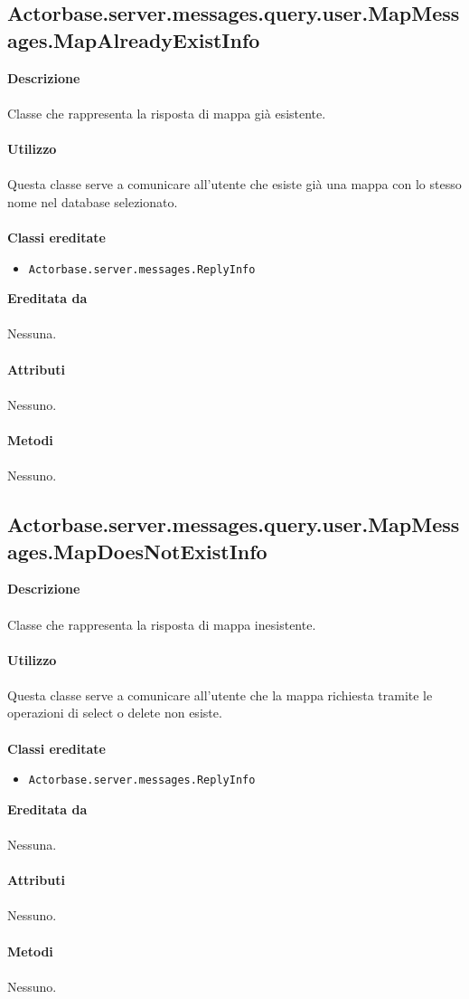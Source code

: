 \documentclass[a4paper]{article}
\begin{document}
	\subsection{Actorbase.server.messages.query.user.MapMessages.MapAlreadyExistInfo}
		\textbf{Descrizione}
			\\ \\
		Classe che rappresenta la risposta di mappa già esistente.
			\\ \\
		\textbf{Utilizzo}
			\\ \\
		Questa classe serve a comunicare all'utente che esiste già una mappa con lo stesso nome nel database selezionato.
			\\ \\
		\textbf{Classi ereditate}
			\begin{itemize}
				\item \texttt{Actorbase.server.messages.ReplyInfo }
			\end{itemize}
		\textbf{Ereditata da}
			\\ \\
			Nessuna.
			\\ \\
		\textbf{Attributi}
			\\ \\
			Nessuno.
			\\ \\
		\textbf{Metodi }
			\\ \\
			Nessuno.
			
	\subsection{Actorbase.server.messages.query.user.MapMessages.MapDoesNotExistInfo}
		\textbf{Descrizione}
			\\ \\
		Classe che rappresenta la risposta di mappa inesistente.
			\\ \\
		\textbf{Utilizzo}
			\\ \\
		Questa classe serve a comunicare all'utente che la mappa richiesta tramite le operazioni di select o delete non esiste.
			\\ \\
		\textbf{Classi ereditate}
			\begin{itemize}
				\item \texttt{Actorbase.server.messages.ReplyInfo }
			\end{itemize}
		\textbf{Ereditata da}
			\\ \\
			Nessuna.
			\\ \\
		\textbf{Attributi}
			\\ \\
			Nessuno.
			\\ \\
		\textbf{Metodi }
			\\ \\
			Nessuno.
			
\end{document}
